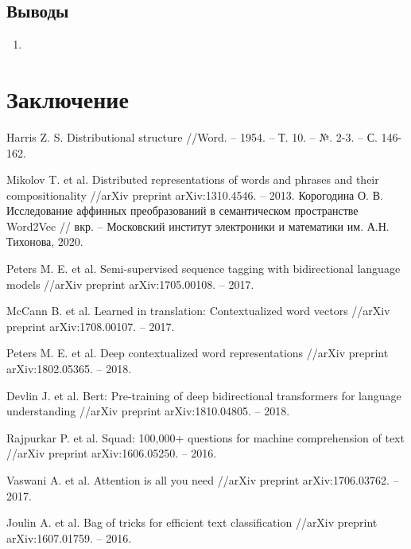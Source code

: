 \documentclass[a4paper,14pt]{article}
\begin{document}
\subsection{Выводы}
\begin{enumerate}
	\itemsep0em 
	\item 
\end{enumerate}

\newpage
\section{Заключение}

\newpage 
\renewcommand{\refname}{{\normalsize \hfill Список использованных источников \hfill}} 

\begin{thebibliography}{30}
Harris Z. S. Distributional structure //Word. – 1954. – Т. 10. – №. 2-3. – С. 146-162.

Mikolov T. et al. Distributed representations of words and phrases and their compositionality //arXiv preprint arXiv:1310.4546. – 2013.
Корогодина  О. В. Исследование аффинных преобразований в семантическом пространстве Word2Vec // вкр. – Московский институт электроники и математики им. А.Н. Тихонова, 2020.

Peters M. E. et al. Semi-supervised sequence tagging with bidirectional language models //arXiv preprint arXiv:1705.00108. – 2017.

McCann B. et al. Learned in translation: Contextualized word vectors //arXiv preprint arXiv:1708.00107. – 2017.

Peters M. E. et al. Deep contextualized word representations //arXiv preprint arXiv:1802.05365. – 2018.

Devlin J. et al. Bert: Pre-training of deep bidirectional transformers for language understanding //arXiv preprint arXiv:1810.04805. – 2018.

Rajpurkar P. et al. Squad: 100,000+ questions for machine comprehension of text //arXiv preprint arXiv:1606.05250. – 2016.

Vaswani A. et al. Attention is all you need //arXiv preprint arXiv:1706.03762. – 2017.

Joulin A. et al. Bag of tricks for efficient text classification //arXiv preprint arXiv:1607.01759. – 2016.


\end{thebibliography}
\end{document}
